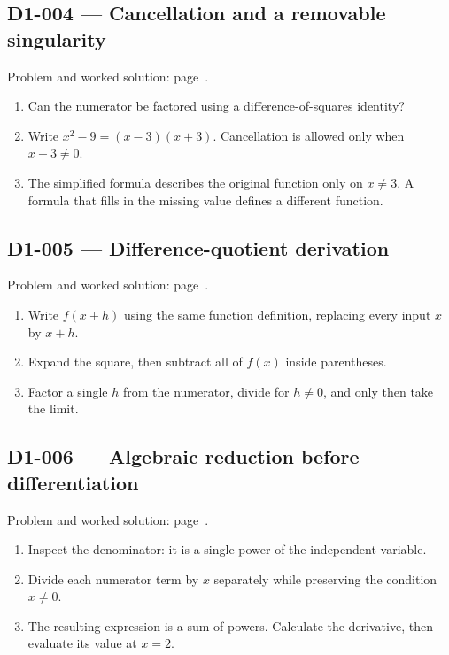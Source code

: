 \documentclass[11pt,oneside,openany]{book}
\begin{document}
\subsection*{D1-004 --- Cancellation and a removable singularity}
\label{hints:D1-004}
Problem and worked solution: page~\pageref{problem:D1-004}.

\begin{enumerate}
\item Can the numerator be factored using a difference-of-squares identity?
\item Write \(x^2-9=(x-3)(x+3)\). Cancellation is allowed only when \(x-3\ne0\).
\item The simplified formula describes the original function only on \(x\ne3\). A formula that fills in the missing value defines a different function.
\end{enumerate}
\subsection*{D1-005 --- Difference-quotient derivation}
\label{hints:D1-005}
Problem and worked solution: page~\pageref{problem:D1-005}.

\begin{enumerate}
\item Write \(f(x+h)\) using the same function definition, replacing every input \(x\) by \(x+h\).
\item Expand the square, then subtract all of \(f(x)\) inside parentheses.
\item Factor a single \(h\) from the numerator, divide for \(h\ne0\), and only then take the limit.
\end{enumerate}
\subsection*{D1-006 --- Algebraic reduction before differentiation}
\label{hints:D1-006}
Problem and worked solution: page~\pageref{problem:D1-006}.

\begin{enumerate}
\item Inspect the denominator: it is a single power of the independent variable.
\item Divide each numerator term by \(x\) separately while preserving the condition \(x\ne0\).
\item The resulting expression is a sum of powers. Calculate the derivative, then evaluate its value at \(x=2\).
\end{enumerate}
\end{document}

